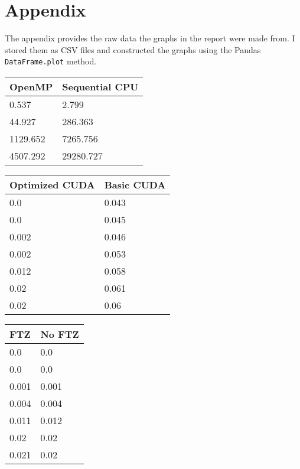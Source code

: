 \section{Appendix} \label{section: appendix A title}
\indent The appendix provides the raw data the graphs in the report were made from. I stored them as CSV files and constructed the graphs using the Pandas \verb|DataFrame.plot| method.

\begin{table}[!ht]
    \centering
    \begin{tabular}{|l|l|}
    \hline
        OpenMP & Sequential CPU \\ \hline
        0.537 & 2.799 \\ \hline
        44.927 & 286.363 \\ \hline
        1129.652 & 7265.756 \\ \hline
        4507.292 & 29280.727 \\ \hline
    \end{tabular}
\end{table}

\begin{table}[!ht]
    \centering
    \begin{tabular}{|l|l|}
    \hline
        Optimized CUDA & Basic CUDA \\ \hline
        0.0 & 0.043 \\ \hline
        0.0 & 0.045 \\ \hline
        0.002 & 0.046 \\ \hline
        0.002 & 0.053 \\ \hline
        0.012 & 0.058 \\ \hline
        0.02 & 0.061 \\ \hline
        0.02 & 0.06 \\ \hline
    \end{tabular}
\end{table}

\begin{table}[!ht]
    \centering
    \begin{tabular}{|l|l|}
    \hline
        FTZ & No FTZ\\ \hline
        0.0 & 0.0 \\ \hline
        0.0 & 0.0 \\ \hline
        0.001 & 0.001 \\ \hline
        0.004 & 0.004 \\ \hline
        0.011 & 0.012 \\ \hline
        0.02 & 0.02 \\ \hline
        0.021 & 0.02 \\ \hline
    \end{tabular}
\end{table}

